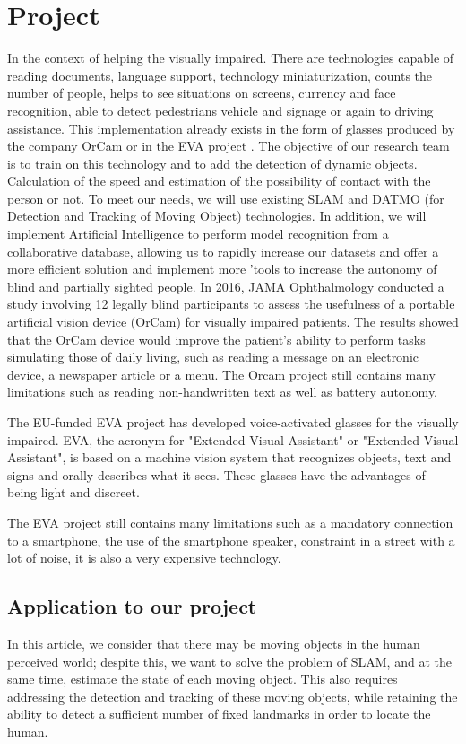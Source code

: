\documentclass[conference,compsoc]{IEEEtran}
\begin{document}
\section{Project}
In the context of helping the visually impaired. There are technologies capable of reading documents, language support, technology miniaturization, counts the number of people, helps to see situations on screens, currency and face recognition, able to detect pedestrians vehicle and signage or again to driving assistance. This implementation already exists in the form of glasses produced by the company OrCam \cite{orcam_2021} or in the EVA project \cite{eva}.
The objective of our research team is to train on this technology and to add the detection of dynamic objects. Calculation of the speed and estimation of the possibility of contact with the person or not.
To meet our needs, we will use existing SLAM and DATMO (for Detection and Tracking of Moving Object) \cite{Pancham2011-11} technologies. In addition, we will implement Artificial Intelligence to perform model recognition from a collaborative database, allowing us to rapidly increase our datasets and offer a more efficient solution and implement more 'tools to increase the autonomy of blind and partially sighted people.
In 2016, JAMA Ophthalmology conducted a study involving 12 legally blind participants to assess the usefulness of a portable artificial vision device (OrCam) for visually impaired patients. The results showed that the OrCam \cite{orcam_2021} device would improve the patient's ability to perform tasks simulating those of daily living, such as reading a message on an electronic device, a newspaper article or a menu.
The Orcam \cite{orcam_2021} project still contains many limitations such as reading non-handwritten text as well as battery autonomy.
 
The EU-funded EVA project \cite{eva} has developed voice-activated glasses for the visually impaired. EVA, the acronym for "Extended Visual Assistant" or "Extended Visual Assistant", is based on a machine vision system that recognizes objects, text and signs and orally describes what it sees. These glasses have the advantages of being light and discreet.

The EVA project \cite{eva} still contains many limitations such as a mandatory connection to a smartphone, the use of the smartphone speaker, constraint in a street with a lot of noise, it is also a very expensive technology.

\subsection{Application to our project}
In this article, we consider that there may be moving objects in the human perceived world; despite this, we want to solve the problem of SLAM, and at the same time, estimate the state of each moving object. This also requires addressing the detection and tracking of these moving objects, while retaining the ability to detect a sufficient number of fixed landmarks in order to locate the human.
\end{document}
